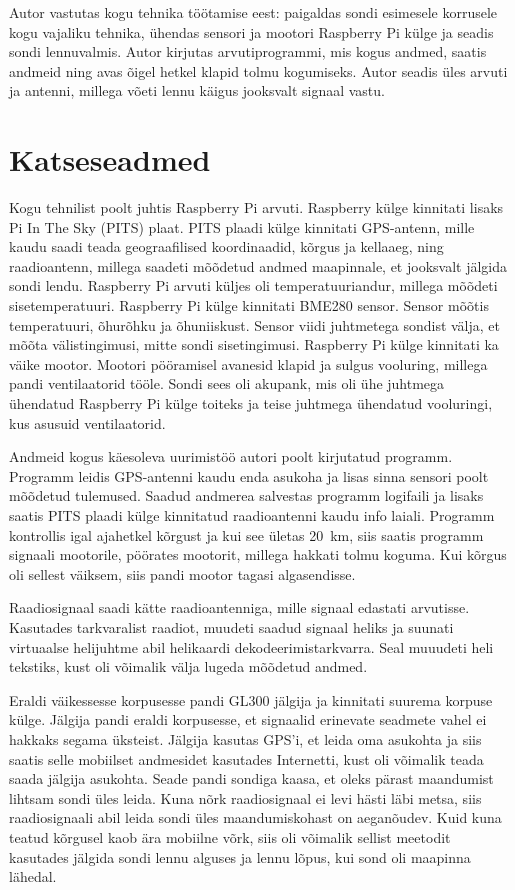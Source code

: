 \documentclass{trkut}%
\begin{document}
Autor vastutas kogu tehnika töötamise eest: paigaldas sondi esimesele korrusele kogu vajaliku tehnika, ühendas sensori ja mootori Raspberry Pi külge ja seadis sondi lennuvalmis. Autor kirjutas arvutiprogrammi, mis kogus andmed, saatis andmeid ning avas õigel hetkel klapid tolmu kogumiseks. Autor seadis üles arvuti ja antenni, millega võeti lennu käigus jooksvalt signaal vastu.

\section{Katseseadmed}
Kogu tehnilist poolt juhtis Raspberry Pi arvuti. Raspberry külge kinnitati lisaks Pi In The Sky (PITS) plaat. PITS plaadi külge kinnitati GPS-antenn, mille kaudu saadi teada geograafilised koordinaadid, kõrgus ja kellaaeg, ning raadioantenn, millega saadeti mõõdetud andmed maapinnale, et jooksvalt jälgida sondi lendu. Raspberry Pi arvuti küljes oli temperatuuriandur, millega mõõdeti sisetemperatuuri. Raspberry Pi külge kinnitati BME280 sensor. Sensor mõõtis temperatuuri, õhurõhku ja õhuniiskust. Sensor viidi juhtmetega sondist välja, et mõõta välistingimusi, mitte sondi sisetingimusi. Raspberry Pi külge kinnitati ka väike mootor. Mootori pööramisel avanesid klapid ja sulgus vooluring, millega pandi ventilaatorid tööle. Sondi sees oli akupank, mis oli ühe juhtmega ühendatud Raspberry Pi külge toiteks ja teise juhtmega ühendatud vooluringi, kus asusuid ventilaatorid.

Andmeid kogus käesoleva uurimistöö autori poolt kirjutatud programm. Programm leidis GPS-antenni kaudu enda asukoha ja lisas sinna sensori poolt mõõdetud tulemused. Saadud andmerea salvestas programm logifaili ja lisaks saatis PITS plaadi külge kinnitatud raadioantenni kaudu info laiali. Programm kontrollis igal ajahetkel kõrgust ja kui see ületas \SI{20}{km}, siis saatis programm signaali mootorile, pöörates mootorit, millega hakkati tolmu koguma. Kui kõrgus oli sellest väiksem, siis pandi mootor tagasi algasendisse.

Raadiosignaal saadi kätte raadioantenniga, mille signaal edastati arvutisse. Kasutades tarkvaralist raadiot, muudeti saadud signaal heliks ja suunati virtuaalse helijuhtme abil helikaardi dekodeerimistarkvarra. Seal muuudeti heli tekstiks, kust oli võimalik välja lugeda mõõdetud andmed.

Eraldi väikessesse korpusesse pandi GL300 jälgija ja kinnitati suurema korpuse külge. Jälgija pandi eraldi korpusesse, et signaalid erinevate seadmete vahel ei hakkaks segama üksteist. Jälgija kasutas GPS'i, et leida oma asukohta ja siis saatis selle mobiilset andmesidet kasutades Internetti, kust oli võimalik teada saada jälgija asukohta. Seade pandi sondiga kaasa, et oleks pärast maandumist lihtsam sondi üles leida. Kuna nõrk raadiosignaal ei levi hästi läbi metsa, siis raadiosignaali abil leida sondi üles maandumiskohast on aeganõudev. Kuid kuna teatud kõrgusel kaob ära mobiilne võrk, siis oli võimalik sellist meetodit kasutades jälgida sondi lennu alguses ja lennu lõpus, kui sond oli maapinna lähedal.
\end{document}
